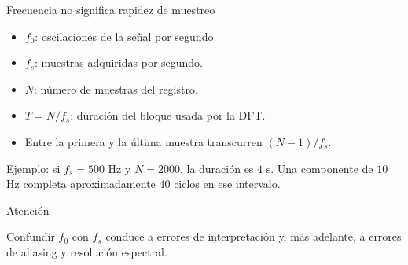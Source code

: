 \documentclass[
  10pt,
  ignorenonframetext,
  aspectratio=169,
  spanish,
]{beamer}
\providecommand{\tightlist}{%
  \setlength{\itemsep}{0pt}\setlength{\parskip}{0pt}}
\begin{document}
\begin{frame}{Frecuencia no significa rapidez de muestreo}
\label{d1-036}
\begin{itemize}
\tightlist
\item
  \(f_0\): oscilaciones de la señal por segundo.
\item
  \(f_s\): muestras adquiridas por segundo.
\item
  \(N\): número de muestras del registro.
\item
  \(T=N/f_s\): duración del bloque usada por la DFT.
\item
  Entre la primera y la última muestra transcurren \((N-1)/f_s\).
\end{itemize}

Ejemplo: si \(f_s=500\) Hz y \(N=2000\), la duración es \(4\) s. Una
componente de \(10\) Hz completa aproximadamente \(40\) ciclos en ese
intervalo.

\begin{alertblock}{Atención}

Confundir \(f_0\) con \(f_s\) conduce a errores de interpretación y, más
adelante, a errores de aliasing y resolución espectral.

\end{alertblock}

\end{frame}
\end{document}
